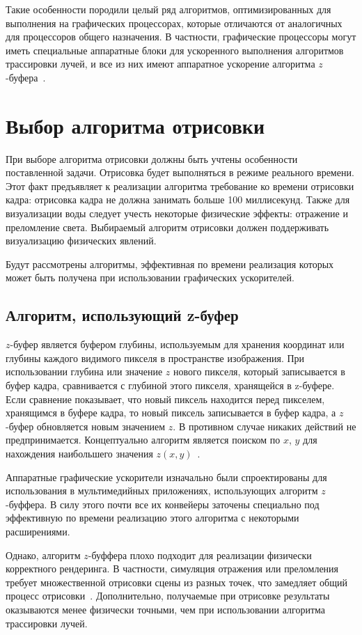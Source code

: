 Такие особенности породили целый ряд алгоритмов, оптимизированных для выполнения 
на графических
процессорах, которые отличаются от аналогичных для процессоров общего назначения. 
В частности, 
графические процессоры могут иметь специальные аппаратные блоки для ускоренного выполнения 
алгоритмов трассировки лучей, и все из них имеют аппаратное ускорение алгоритма $z$-буфера~\cite{RTiv}.

\section{Выбор алгоритма отрисовки}

При выборе алгоритма отрисовки должны быть учтены особенности поставленной задачи.
Отрисовка будет выполняться в режиме реального времени. Этот факт 
предъявляет к реализации алгоритма требование ко времени отрисовки кадра: 
отрисовка кадра не должна занимать больше 100 миллисекунд. 
Также для визуализации воды следует учесть
некоторые физические эффекты: отражение и преломление света. Выбираемый алгоритм отрисовки
должен поддерживать визуализацию физических явлений.

Будут рассмотрены алгоритмы, эффективная по времени реализация которых может быть получена при использовании
графических ускорителей. 

\subsection{Алгоритм, использующий z-буфер}
$z$-буфер является буфером глубины, используемым для хранения координат или глубины 
каждого видимого пикселя в пространстве изображения. При использовании глубина или значение $z$ нового пикселя, 
который записывается в буфер кадра, сравнивается с глубиной этого пикселя, хранящейся в z-буфере. 
Если сравнение показывает, что новый пиксель находится перед пикселем, хранящимся в буфере кадра, 
то новый пиксель записывается в буфер кадра, а $z$-буфер обновляется новым значением $z$. 
В противном случае никаких действий не предпринимается. Концептуально алгоритм является поиском 
по $x$, $y$ для нахождения наибольшего значения $z(x, y)$~\cite{Rodzhers}.

Аппаратные графические ускорители изначально были спроектированы для использования в мультимедийных
приложениях, использующих алгоритм $z$-буффера. В силу этого почти все их конвейеры заточены
специально под эффективную по времени реализацию этого алгоритма с некоторыми расширениями. 

Однако, алгоритм $z$-буффера плохо подходит для реализации физически корректного рендеринга.
В частности, симуляция отражения или преломления требует множественной отрисовки сцены
из разных точек, что замедляет общий процесс отрисовки~\cite{FoCG}. Дополнительно, получаемые при отрисовке
результаты оказываются менее физически точными, чем при использовании алгоритма трассировки лучей.

